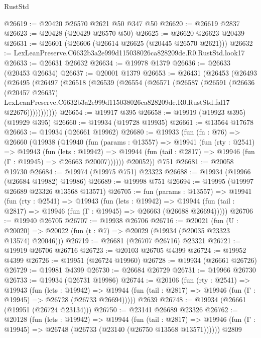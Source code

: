 \begin{lexlean}{RustStd}
\begin{coremodule}
@26619 := @20420 @26570 @2621 @50 @347 @50
@26620 := @26619 @2837
@26623 := @20428 (@20429 @26570 @50)
@26625 := @26620 @26623 @20439
@26631 := @26601 (@26606 (@26614 @26625 (@20445 @26570 @2621)))
@26632 := LexLeanPreserve.C6632b3a2e999d115038026ca828209de.R0.RustStd.look17
@26633 := @26631 @26632
@26634 := @19978 @1379
@26636 := @26633 (@20453 @26634)
@26637 := @20001 @1379
@26653 := @26431
    (@26453
      (@26493
        (@26495
          (@26497
            (@26518
              (@26539
                (@26554
                  (@26571
                    (@26587
                      (@26591
                        (@26636
                          (@20457 @26637)
                          LexLeanPreserve.C6632b3a2e999d115038026ca828209de.R0.RustStd.fal17
                          @22676)))))))))))
@26654 := @19917 @395
@26658 := @19919 (@19923 @395) (@19929 @395)
@26660 := @19934 (@19728 @19935)
@26661 := @13564 @17678
@26663 := @19934 (@26661 @19962)
@26680 := @19933
    (fun (fn : @76) =>
    @26660
      (@19938
        (@19940
          (fun (params : @13557) =>
          @19941
            (fun (rty : @2541) =>
            @19943
              (fun (lets : @19942) =>
              @19944 (fun (tail : @2817) => @19946 (fun (Γ : @19945) => @26663 @20007))))))
        @20052))
    @751
@26681 := @20058 @19730
@26684 := @19974 (@19975 @751) @23323
@26688 := @19934 (@19966 (@26684 @19982) @19986)
@26689 := @19998 @751
@26694 := @19995 (@19997 @26689 @23326 @13568 @13571)
@26705 := fun (params : @13557) =>
  @19941
    (fun (rty : @2541) =>
    @19943
      (fun (lets : @19942) =>
      @19944 (fun (tail : @2817) => @19946 (fun (Γ : @19945) => @26663 (@26688 @26694)))))
@26706 := @19940 @26705
@26707 := @19938 @26706
@26716 := @20021
    (fun (U : @20020) => @20022 (fun (t : @7) => @20029 (@19934 (@20035 @23323 @13574) @20046)))
@26719 := @26681 (@26707 @26716) @23321
@26721 := @19919 @26706 @26716
@26723 := @20103 @26705 @4399
@26724 := @19952 @4399
@26726 := @19951 (@26724 @19960)
@26728 := @19934 (@26661 @26726)
@26729 := @19981 @4399
@26730 := @26684 @26729
@26731 := @19966 @26730
@26733 := @19934 (@26731 @19986)
@26744 := @20106
    (fun (rty : @2541) =>
    @19943
      (fun (lets : @19942) =>
      @19944 (fun (tail : @2817) => @19946 (fun (Γ : @19945) => @26728 (@26733 @26694)))))
    @2639
@26748 := @19934 (@26661 (@19951 (@26724 @23134)))
@26750 := @23141 @26689 @23326
@26762 := @20128
    (fun (lets : @19942) =>
    @19944
      (fun (tail : @2817) =>
      @19946 (fun (Γ : @19945) => @26748 (@26733 (@23140 (@26750 @13568 @13571))))))
    @2809

\end{coremodule}
\end{lexlean}
